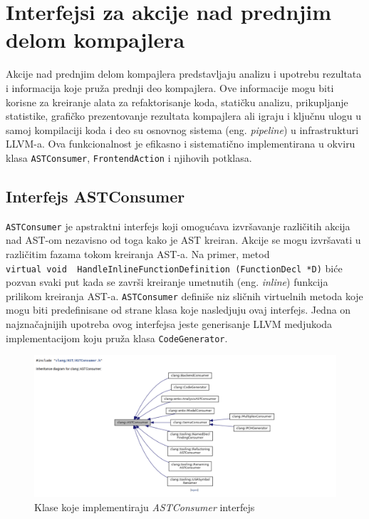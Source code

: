 \documentclass[12pt,oneside]{memoir}
\begin{document}
\section{Interfejsi za akcije nad prednjim delom kompajlera}

Akcije nad prednjim delom kompajlera predstavljaju analizu i upotrebu rezultata i informacija koje pru\v{z}a prednji deo kompajlera. Ove informacije mogu biti korisne za kreiranje alata za refaktorisanje koda, stati\v{c}ku analizu, prikupljanje statistike, grafi\v{c}ko prezentovanje rezultata kompajlera ali igraju i klju\v{c}nu ulogu u samoj kompilaciji koda i deo su osnovnog sistema (eng. \textit{pipeline}) u infrastrukturi LLVM-a.
Ova funkcionalnost je efikasno i sistemati\v{c}no implementirana u okviru klasa \lstinline{ASTConsumer}, \lstinline{FrontendAction} i njihovih potklasa.

\subsection{Interfejs ASTConsumer}
\lstinline{ASTConsumer} je apstraktni interfejs koji omogu\'{c}ava izvr\v{s}avanje razli\v{c}itih akcija nad AST-om nezavisno od toga kako je AST kreiran.
Akcije se mogu izvr\v{s}avati u razli\v{c}itim fazama tokom kreiranja AST-a. Na primer, metod \\ \lstinline{virtual void  HandleInlineFunctionDefinition (FunctionDecl *D)} bi\'{c}e pozvan svaki put kada se zavr\v{s}i kreiranje umetnutih (eng. \textit{inline}) funkcija prilikom kreiranja AST-a. \lstinline{ASTConsumer} defini\v{s}e niz sli\v{c}nih virtuelnih metoda koje mogu biti predefinisane od strane klasa koje nasledjuju ovaj interfejs. Jedna on najzna\v{c}ajnijih upotreba ovog interfejsa jeste generisanje LLVM medjukoda implementacijom koju pru\v{z}a klasa \lstinline{CodeGenerator}. 

\begin{figure}[!h]
\begin{center}
\includegraphics[scale=0.3]{ASTConsumer2.png}
\end{center}
\caption{Klase koje implementiraju \textit{ASTConsumer} interfejs}
\label{fig:exploded}
\end{figure}
\end{document}
